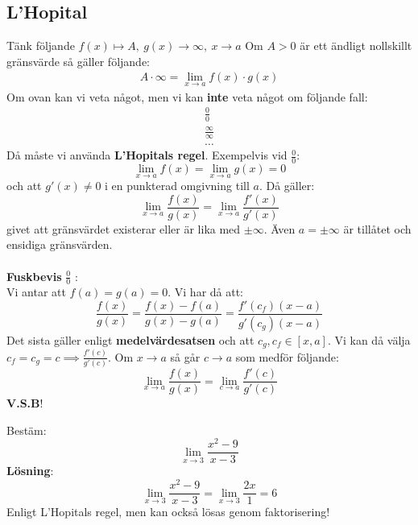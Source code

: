 \documentclass{report}
\begin{document}
\subsection{L'Hopital}
{
Tänk följande $ f(x) \mapsto A,\:g(x) \to \infty, \:x \to a $ Om $ A > 0 $ är ett ändligt nollskillt gränsvärde så gäller följande:
\begin{align*}
A \cdot \infty = \lim_{x \to a} f(x) \cdot g(x)
\end{align*}
Om ovan kan vi veta något, men vi kan \textbf{inte} veta något om följande fall:
\begin{align*}
\frac{0}{0}\\
\frac{ \infty}{ \infty}\\
\ldots 
\end{align*}
Då måste vi använda \textbf{L'Hopitals regel}. Exempelvis vid $ \frac{0}{0}  $:
\begin{equation*}
\lim_{x \to a} f(x) = \lim_{x \to a} g(x) = 0
\end{equation*}
och att $ g'(x) \ne 0 $ i en punkterad omgivning till $ a $. Då gäller:
\begin{equation*}
	\lim_{x \to a} \frac{f(x)}{g(x)} = \lim_{x \to a} \frac{f'(x)}{g'(x)} 
\end{equation*}
givet att gränsvärdet existerar eller är lika med $ \pm \infty $. Även $ a = \pm \infty $ är tillåtet och ensidiga gränsvärden.\\\\

\textbf{Fuskbevis} $ \frac{0}{0}  $ :\\
Vi antar att $ f(a) = g(a) = 0 $. Vi har då att:
\begin{equation*}
\frac{f(x)}{g(x)} = \frac{f(x)-f(a)}{g(x)-g(a)} = \frac{f'(c_f)(x-a)}{g'(c_g)(x-a)} 
\end{equation*}
Det sista gäller enligt \textbf{medelvärdesatsen} och att $ c_g,c_f \in [x, a] $. Vi kan då välja $ c_f = c_g = c \implies \frac{f'(c)}{g'(c)} $. Om $ x \to a $ så går $ c \to a $ som medför följande:
\begin{equation*}
\lim_{x \to a} \frac{f(x)}{g(x)} = \lim_{c \to a} \frac{f'(c)}{g'(c)} 
\end{equation*}
\textbf{V.S.B}!
}

\ex{}
{
Bestäm:
\begin{equation*}
\lim_{x \to 3} \frac{x^2-9}{x-3} 
\end{equation*}
\textbf{Lösning}:\\
\begin{equation*}
	\lim_{x \to 3} \frac{x^2-9}{x-3} = \lim_{x \to 3} \frac{2x}{1} = 6 
\end{equation*}
Enligt L'Hopitals regel, men kan också lösas genom faktorisering!
}
\end{document}
